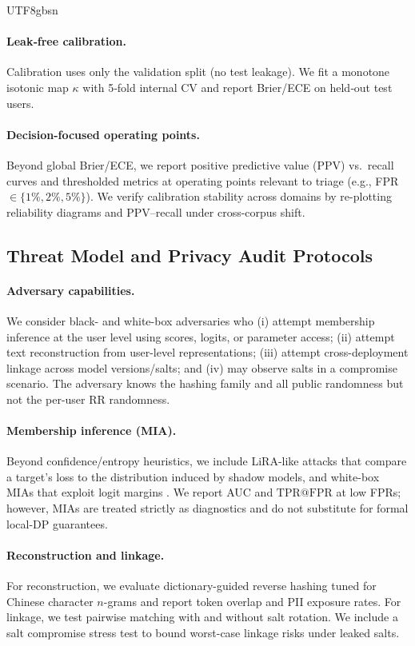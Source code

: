 \documentclass[lettersize,journal]{IEEEtran}
\begin{document}
\begin{CJK*}{UTF8}{gbsn}
\paragraph{Leak‑free calibration.}
Calibration uses only the validation split (no test leakage). We fit a monotone isotonic map $\kappa$ with 5‑fold internal CV and report Brier/ECE on held‑out test users.

\paragraph{Decision-focused operating points.}
Beyond global Brier/ECE, we report positive predictive value (PPV) vs.\ recall curves and thresholded metrics at operating points relevant to triage (e.g., FPR $\in \{1\%, 2\%, 5\%\}$). We verify calibration stability across domains by re-plotting reliability diagrams and PPV–recall under cross-corpus shift.


\subsection{Threat Model and Privacy Audit Protocols}
\label{sec:threat}
\paragraph{Adversary capabilities.}
We consider black- and white-box adversaries who (i) attempt membership inference at the user level using scores, logits, or parameter access; (ii) attempt text reconstruction from user-level representations; (iii) attempt cross-deployment linkage across model versions/salts; and (iv) may observe salts in a compromise scenario. The adversary knows the hashing family and all public randomness but not the per-user RR randomness.

\paragraph{Membership inference (MIA).}
Beyond confidence/entropy heuristics, we include LiRA-like attacks that compare a target's loss to the distribution induced by shadow models, and white-box MIAs that exploit logit margins \cite{shokri2017mia,shejwalkar2021nlpmia}. We report AUC and $\mathrm{TPR}@\mathrm{FPR}$ at low FPRs; however, MIAs are treated strictly as diagnostics and do not substitute for formal local-DP guarantees.

\paragraph{Reconstruction and linkage.}
For reconstruction, we evaluate dictionary-guided reverse hashing tuned for Chinese character $n$-grams and report token overlap and PII exposure rates. For linkage, we test pairwise matching with and without salt rotation. We include a salt compromise stress test to bound worst-case linkage risks under leaked salts.


\end{CJK*}
\end{document}

